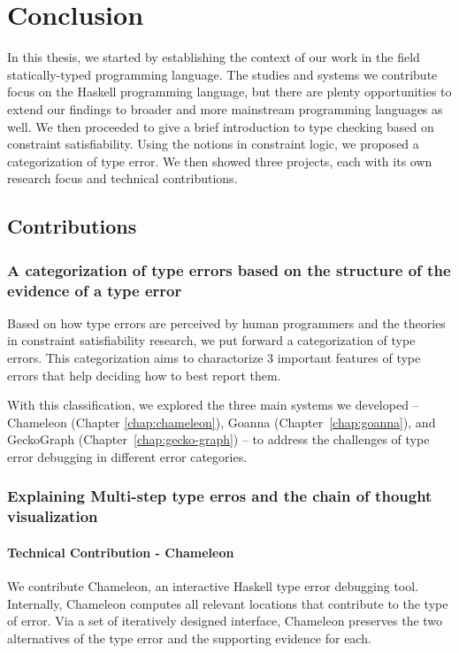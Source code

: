 

\chapter{Conclusion}

\label{chap:conclusion} 



\graphicspath{{Figures/Conclusion}}

In this thesis, we started by establishing the context of our work in the field statically-typed programming language. The studies and systems we contribute focus on the Haskell programming language, but there are plenty opportunities to extend our findings to broader and more mainstream programming languages as well. We then proceeded to give a brief introduction to type checking based on constraint satisfiability. Using the notions in constraint logic, we proposed a categorization of type error. We then showed three projects, each with its own research focus and technical contributions.


\section{Contributions}


\subsection{A categorization of type errors based on the structure of the evidence of a type error}

Based on how type errors are perceived by human programmers and the theories in constraint satisfiability research, we put forward a categorization of type errors. This categorization aims to charactorize 3 important features of type errors that help deciding how to best report them. 


With this classification, we explored the three main systems we developed --  Chameleon (Chapter \ref{chap:chameleon}), Goanna (Chapter~\ref{chap:goanna}), and GeckoGraph (Chapter~\ref{chap:gecko-graph}) -- to address the challenges of type error debugging in different error categories.

\subsection{Explaining Multi-step type erros and the chain of thought visualization}

\subsubsection{Technical Contribution - Chameleon}
We contribute Chameleon, an interactive Haskell type error debugging tool. Internally, Chameleon computes all relevant locations that contribute to the type of error. Via a set of iteratively designed interface, Chameleon preserves the two alternatives of the type error and the supporting evidence for each.

